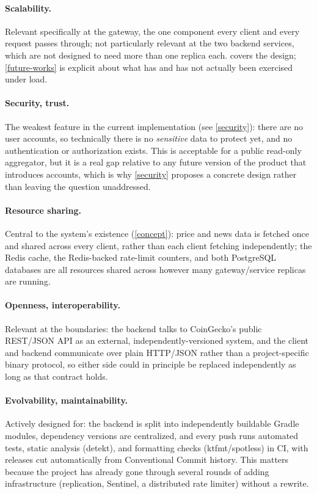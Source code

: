 \documentclass{scrartcl}
\begin{document}
\paragraph{Scalability.} Relevant specifically at the gateway, the one component every client
and every request passes through; not particularly relevant at the two backend services, which
are not designed to need more than one replica each.  covers the design;
\cref{future-works} is explicit about what has and has not actually been exercised under load.

\paragraph{Security, trust.} The weakest feature in the current implementation (see
\cref{security}): there are no user accounts, so technically there is no \emph{sensitive} data to
protect yet, and no authentication or authorization exists. This is acceptable for a public
read-only aggregator, but it is a real gap relative to any future version of the product that
introduces accounts, which is why \cref{security} proposes a concrete design rather than leaving
the question unaddressed.

\paragraph{Resource sharing.} Central to the system's existence (\cref{concept}): price and news
data is fetched once and shared across every client, rather than each client fetching
independently; the Redis cache, the Redis-backed rate-limit counters, and both PostgreSQL
databases are all resources shared across however many gateway/service replicas are running.

\paragraph{Openness, interoperability.} Relevant at the boundaries: the backend talks to
CoinGecko's public REST/JSON API as an external, independently-versioned system, and the client
and backend communicate over plain HTTP/JSON rather than a project-specific binary protocol, so
either side could in principle be replaced independently as long as that contract holds.

\paragraph{Evolvability, maintainability.} Actively designed for: the backend is split into
independently buildable Gradle modules, dependency versions are centralized, and every push runs
automated tests, static analysis (detekt), and formatting checks (ktfmt/spotless) in CI, with
releases cut automatically from Conventional Commit history. This matters because the project
has already gone through several rounds of adding infrastructure (replication, Sentinel, a
distributed rate limiter) without a rewrite.
\end{document}
